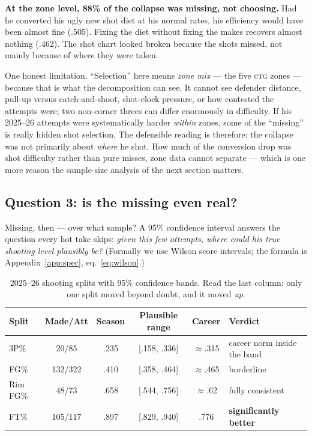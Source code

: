 \documentclass[11pt]{article}
\newcommand{\ctg}{\textsc{ctg}}
\begin{document}
\textbf{At the zone level, 88\% of the collapse was missing, not choosing.} Had he
converted his ugly new shot diet at his normal rates, his efficiency would have been
almost fine (.505). Fixing the diet without fixing the makes recovers almost nothing
(.462). The shot chart looked broken because the shots missed, not mainly because of
where they were taken.

One honest limitation. ``Selection'' here means \emph{zone mix} --- the five \ctg{}
zones --- because that is what the decomposition can see. It cannot see defender
distance, pull-up versus catch-and-shoot, shot-clock pressure, or how contested the
attempts were; two non-corner threes can differ enormously in difficulty. If his
2025--26 attempts were systematically harder \emph{within} zones, some of the
``missing'' is really hidden shot selection. The defensible reading is therefore: the
collapse was not primarily about \emph{where} he shot. How much of the conversion drop
was shot difficulty rather than pure misses, zone data cannot separate --- which is one
more reason the sample-size analysis of the next section matters.

\subsection{Question 3: is the missing even real?}
\label{sec:ci}

Missing, then --- over what sample? A 95\% confidence interval answers the question every
hot take skips: \emph{given this few attempts, where could his true shooting level
plausibly be?} (Formally we use Wilson score intervals; the formula is
Appendix~\ref{app:spec}, eq.~\ref{eq:wilson}.)

\begin{table}[h]
\centering\small
\caption{2025--26 shooting splits with 95\% confidence bands. Read the last column: only
one split moved beyond doubt, and it moved \emph{up}.}
\begin{tabular}{lccccl}
\toprule
Split & Made/Att & Season & Plausible range & Career & Verdict \\
\midrule
3P\% & 20/85 & .235 & [.158, .336] & $\approx$.315 & career norm inside the band \\
FG\% & 132/322 & .410 & [.358, .464] & $\approx$.465 & borderline \\
Rim FG\% & 48/73 & .658 & [.544, .756] & $\approx$.62 & fully consistent \\
FT\% & 105/117 & .897 & [.829, .940] & .776 & \textbf{significantly better} \\
\bottomrule
\end{tabular}
\label{tab:wilson}
\end{table}
\end{document}
